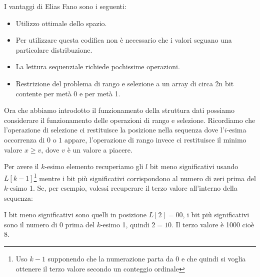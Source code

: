 I vantaggi di Elias Fano sono i seguenti:
\begin{itemize}
    \item Utilizzo ottimale dello spazio.
    \item Per utilizzare questa codifica non è necessario che i valori seguano una particolare distribuzione.
    \item La lettura sequenziale richiede pochissime operazioni.
    \item Restrizione del problema di rango e selezione a un array di circa 2n bit contente per metà 0 e per metà 1.
\end{itemize}
Ora che abbiamo introdotto il funzionamento della struttura dati possiamo considerare il funzionamento delle operazioni di rango e selezione. Ricordiamo che l'operazione di selezione ci restituisce la posizione nella sequenza dove l'$i$-esima occorrenza di $0$ o $1$ appare, l'operazione di rango invece ci restituisce il minimo valore $x \geq v$, dove $v$ è un valore a piacere.

Per avere il $k$-esimo elemento recuperiamo gli $l$ bit meno significativi usando $L[k - 1]$\footnote{Uso $k - 1$ supponendo che la numerazione parta da 0 e che quindi si voglia ottenere il terzo valore secondo un conteggio ordinale} mentre i bit più significativi corrispondono al numero di zeri prima del $k$-esimo 1. Se, per esempio, volessi recuperare il terzo valore all'interno della sequenza:

I bit meno significativi sono quelli in posizione $L[2] = 00$, i bit più significativi sono il numero di 0 prima del $k$-esimo 1, quindi $2 = 10$. Il terzo valore è 1000 cioè $8$.

